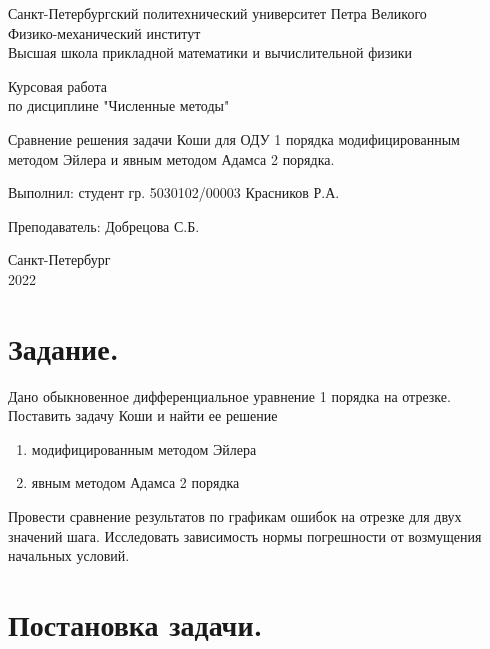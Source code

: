 \documentclass[a4paper, 12pt]{article}
\begin{document}
	\begin{titlepage}
		\begin{center}
			Санкт-Петербургский политехнический университет Петра Великого \\ Физико-механический институт \\ Высшая школа прикладной математики и вычислительной физики
		\end{center}
		\vspace{10em}
		\begin{center}
			\Large Курсовая работа \\ по дисциплине "Численные методы"
		\end{center}
		\vspace{1em}
		\begin{center}
			\Huge Сравнение решения задачи Коши для ОДУ 1 порядка модифицированным методом Эйлера и явным методом Адамса 2 порядка.
		\end{center}
		\vspace{15em}
		{\Large 
			
			Выполнил: студент гр. 5030102/00003 Красников Р.А.
			\vspace{1em}
			
			Преподаватель: Добрецова С.Б.}
		\vspace{\fill}
		\begin{center}
			Санкт-Петербург \\ 2022
		\end{center}
	\end{titlepage}
	\newpage
	
	\tableofcontents
	
	\newpage
	
	\section{Задание.}
	
	Дано обыкновенное дифференциальное уравнение 1 порядка на отрезке. Поставить задачу Коши и найти ее решение
	\begin{enumerate}
		\item модифицированным методом Эйлера
		\item явным методом Адамса 2 порядка
	\end{enumerate}
	
	Провести сравнение результатов по графикам ошибок на отрезке для двух значений шага. Исследовать зависимость нормы погрешности от возмущения начальных условий.
	
	\section{Постановка задачи.}
	
\end{document}
